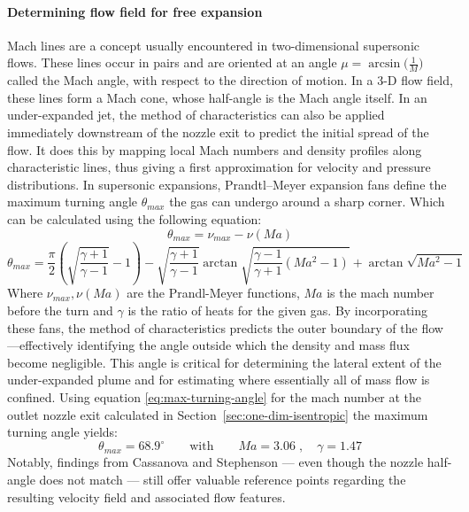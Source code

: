 	\paragraph*{Determining flow field for free expansion}
		Mach lines are a concept usually encountered in two-dimensional supersonic flows. 
		These lines occur in pairs and are oriented at an angle $\mu = \arcsin\!\bigl(\frac{1}{M}\bigr)$ called the Mach angle, with respect to the direction of motion.
		In a 3-D flow field, these lines form a Mach cone, whose half-angle is the Mach angle itself.
		In an under-expanded jet, the method of characteristics can also be applied immediately downstream of the nozzle exit to predict the initial spread of the flow.
		It does this by mapping local Mach numbers and density profiles along characteristic lines, thus giving 
		a first approximation for velocity and pressure distributions.
		In supersonic expansions, Prandtl–Meyer expansion fans define the maximum turning angle $\theta_{max}$ the gas can undergo around a sharp corner.
		Which can be calculated using the following equation:
		\begin{equation*}
			\theta_{max} = \nu_{max} - \nu(Ma)
		\end{equation*}
		\begin{equation}
			\theta_{max} = \frac{\pi}{2} \left(\sqrt{\frac{\gamma + 1}{\gamma - 1}} - 1\right) - \sqrt{\frac{\gamma + 1}{\gamma - 1}}\arctan{\sqrt{\frac{\gamma - 1}{\gamma + 1}(Ma^2 - 1)}} + \arctan{\sqrt{Ma^2 -1}}
			\label{eq:max-turning-angle}
		\end{equation}
		Where $\nu_{max},\nu(Ma)$ are the Prandl-Meyer functions, $Ma$ is the mach number before the turn and $\gamma$ is the ratio of heats for the given gas.
		By incorporating these fans, the method of characteristics predicts the outer boundary of the flow—effectively identifying the angle outside which the density and mass flux become negligible.
		This angle is critical for determining the lateral extent of the under-expanded plume and for estimating where essentially all of mass flow is confined.
		Using equation \eqref{eq:max-turning-angle} for the mach number at the outlet nozzle exit calculated in Section~\ref{sec:one-dim-isentropic} the maximum turning angle yields:
		$$
			\theta_{max} = 68.9^\circ
			\qquad \text{with} \qquad
			Ma = 3.06\;,\quad \gamma = 1.47
		$$
		Notably, findings from Cassanova and Stephenson \cite{Cassanova1965} — even though the nozzle half-angle does not match — still offer valuable reference points regarding the resulting velocity field and associated flow features.
